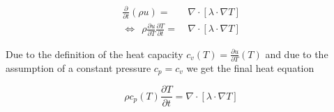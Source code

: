 \documentclass{scrartcl}[12pt, halfparskip]
\newcommand{\todo}[1]{\textcolor{red}{TODO: #1}}
\begin{document}
\begin{align}
	\frac{\partial}{\partial t}(\rho u) = & \ \nabla \cdot \left[ \lambda \cdot \nabla T \right] \\
	\Leftrightarrow \ \ \rho \frac{\partial u}{\partial T} \frac{\partial T}{\partial t} = & \ \nabla \cdot \left[ \lambda \cdot \nabla T \right]
\end{align}

Due to the definition of the heat capacity $c_v(T) = \frac{\partial u}{\partial T}(T)$ and due to the assumption of a constant pressure $c_p = c_v$ we get the final heat equation

\begin{equation}
	\rho c_p(T) \frac{\partial T}{\partial t} = \nabla \cdot \left[ \lambda \cdot \nabla T \right]
	\label{eq:heat_equation_derivation}
\end{equation}




%
%
%
%
%
%
%
%
\end{document}
